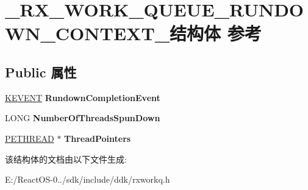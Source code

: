 \hypertarget{struct___r_x___w_o_r_k___q_u_e_u_e___r_u_n_d_o_w_n___c_o_n_t_e_x_t__}{}\section{\+\_\+\+R\+X\+\_\+\+W\+O\+R\+K\+\_\+\+Q\+U\+E\+U\+E\+\_\+\+R\+U\+N\+D\+O\+W\+N\+\_\+\+C\+O\+N\+T\+E\+X\+T\+\_\+结构体 参考}
\label{struct___r_x___w_o_r_k___q_u_e_u_e___r_u_n_d_o_w_n___c_o_n_t_e_x_t__}
\subsection*{Public 属性}
\begin{DoxyCompactItemize}
\item 
\mbox{\label{struct___r_x___w_o_r_k___q_u_e_u_e___r_u_n_d_o_w_n___c_o_n_t_e_x_t___a6ba2eafc54ed6ef3967f96c421cbe5bc}} 
\hyperlink{struct___k_e_v_e_n_t}{K\+E\+V\+E\+NT} {\bfseries Rundown\+Completion\+Event}
\item 
\mbox{\label{struct___r_x___w_o_r_k___q_u_e_u_e___r_u_n_d_o_w_n___c_o_n_t_e_x_t___a7fa03a7e44f66704f4618a85ba28d95d}} 
L\+O\+NG {\bfseries Number\+Of\+Threads\+Spun\+Down}
\item 
\mbox{\label{struct___r_x___w_o_r_k___q_u_e_u_e___r_u_n_d_o_w_n___c_o_n_t_e_x_t___a9ae072f61f843d10bf304a0a9e8f5030}} 
\hyperlink{struct___e_t_h_r_e_a_d}{P\+E\+T\+H\+R\+E\+AD} $\ast$ {\bfseries Thread\+Pointers}
\end{DoxyCompactItemize}


该结构体的文档由以下文件生成\+:\begin{DoxyCompactItemize}
\item 
E\+:/\+React\+O\+S-\/0../sdk/include/ddk/rxworkq.\+h\end{DoxyCompactItemize}
